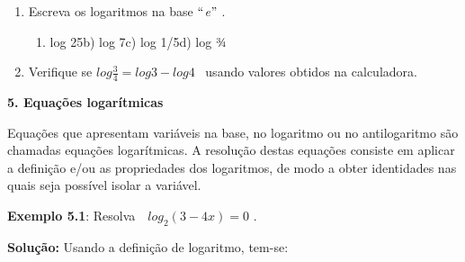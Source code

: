 \documentclass[12pt]{article}
\begin{document}
\begin{enumerate}[label*={\fontsize{14pt}{14pt}\selectfont \textbf{\arabic*.}}]
\begin{enumerate}
\begin{enumerate}
	\item ln 2\tab \tab b) ln 20\tab c) ln 18\tab d) ln \textit{e}
\end{enumerate}\par


\vspace{\baselineskip}
	\item Escreva os logaritmos na base $``$\textit{e}$"$ . \par

\begin{enumerate}
	\item log 25\tab \tab b) log 7\tab c) log 1/5\tab d) log ¾
\end{enumerate}\par


\vspace{\baselineskip}
	\item Verifique se  \( log\frac{3}{4}=log3-log4 \) \  usando valores obtidos na calculadora.
\end{enumerate}\par


\vspace{\baselineskip}

\vspace{\baselineskip}
\begin{justify}
{\fontsize{14pt}{16.8pt}\selectfont \textbf{5. Equações logarítmicas}\par}
\end{justify}\par

\begin{justify}
Equações que apresentam variáveis na base, no logaritmo ou no antilogaritmo são chamadas equações logarítmicas. A resolução destas equações consiste em aplicar a definição e/ou as propriedades dos logaritmos, de modo a obter identidades nas quais seja possível isolar a variável.
\end{justify}\par


\vspace{\baselineskip}
\begin{justify}
\textbf{Exemplo 5.1}: Resolva\  \   \( log_{2} \left( 3-4x \right) =0 \) .
\end{justify}\par

\begin{justify}
\textbf{Solução: }Usando a definição de logaritmo, tem-se:
\end{justify}\par


\end{enumerate}
\end{document}
